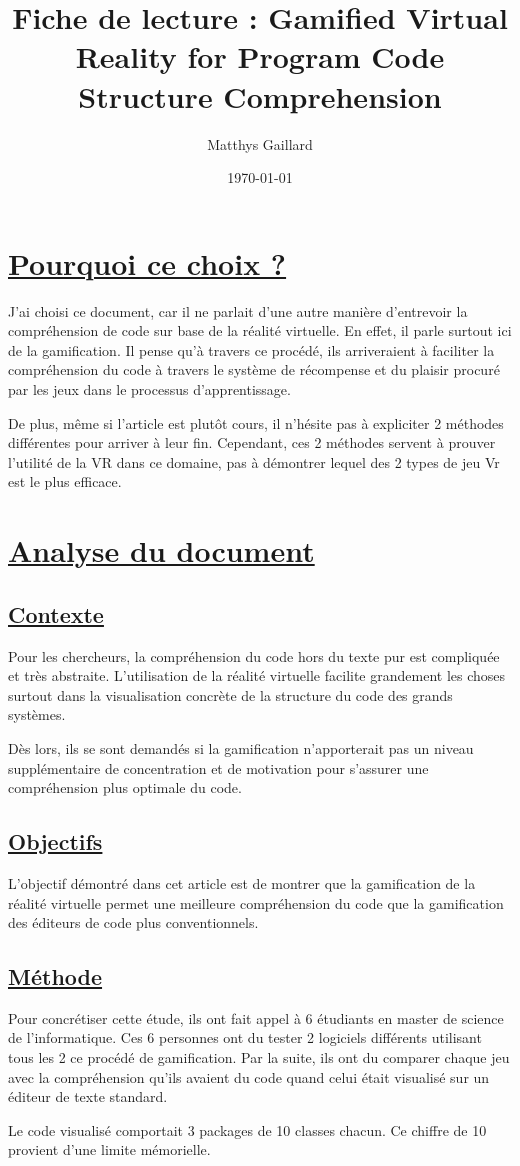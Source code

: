 \documentclass[a4paper,10pt, oneside]{article}
\title{Fiche de lecture : Gamified Virtual Reality for Program Code Structure Comprehension}
\author{Matthys Gaillard}
\date{\today}
\newcommand{\li}{\newline}
\begin{document}
\maketitle
\section{\ul{Pourquoi ce choix ?}}
        \par J'ai choisi ce document, car il ne parlait d'une autre manière d'entrevoir la compréhension de code sur base de la réalité virtuelle\cite{A1}.
        En effet, il parle surtout ici de la gamification. Il pense qu'à travers ce procédé, ils arriveraient à faciliter la compréhension du code à travers le système
        de récompense et du plaisir procuré par les jeux dans le processus d'apprentissage.\li
        \par De plus, même si l'article est plutôt cours, il n'hésite pas à expliciter 2 méthodes différentes pour arriver à leur fin. Cependant, ces 2 méthodes servent à prouver l'utilité de la VR dans ce domaine, pas
        à démontrer lequel des 2 types de jeu Vr est le plus efficace.
\section{\ul{Analyse du document}}
\subsection{\ul{Contexte}}
        \par Pour les chercheurs, la compréhension du code hors du texte pur est compliquée et très abstraite. L'utilisation de la réalité virtuelle
        facilite grandement les choses surtout dans la visualisation concrète de la structure du code des grands systèmes.\li
        \par Dès lors, ils se sont demandés si la gamification n'apporterait pas un niveau supplémentaire de concentration et de motivation pour s'assurer une 
        compréhension plus optimale du code.
\subsection{\ul{Objectifs}}
        \par L'objectif démontré dans cet article est de montrer que la gamification de la réalité virtuelle permet une meilleure compréhension du code que la gamification des éditeurs de code plus conventionnels.
\subsection{\ul{Méthode}}
        \par Pour concrétiser cette étude, ils ont fait appel à 6 étudiants en master de science de l'informatique. Ces 6 personnes ont du tester 2 logiciels différents utilisant tous les 2 ce procédé de gamification.
        Par la suite, ils ont du comparer chaque jeu avec la compréhension qu'ils avaient du code quand celui était visualisé sur un éditeur de texte standard.\li
        \par Le code visualisé comportait 3 packages de 10 classes chacun. Ce chiffre de 10 provient d'une limite mémorielle.
\end{document}
